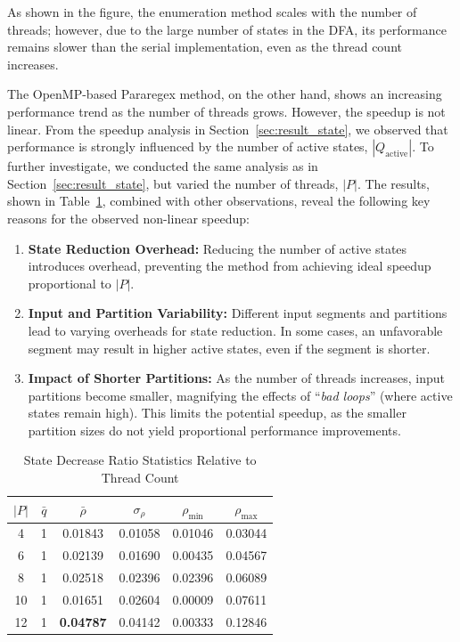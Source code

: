 \documentclass[sigconf]{acmart}
\newcommand{\minof}[1]{#1_{\text{min}}}
\newcommand{\maxof}[1]{#1_{\text{max}}}
\begin{document}
As shown in the figure, the enumeration method scales with the number of threads; however, due to the large number of states in the DFA, its performance remains slower than the serial implementation, even as the thread count increases.

The OpenMP-based Pararegex method, on the other hand, shows an increasing performance trend as the number of threads grows. However, the speedup is not linear. From the speedup analysis in Section~\ref{sec:result_state}, we observed that performance is strongly influenced by the number of active states, $|Q_{\text{active}}|$. To further investigate, we conducted the same analysis as in Section~\ref{sec:result_state}, but varied the number of threads, $|P|$. The results, shown in Table~\ref{tab:StateReductionThread}, combined with other observations, reveal the following key reasons for the observed non-linear speedup:

\begin{enumerate}
	\item \textbf{State Reduction Overhead:} Reducing the number of active states introduces overhead, preventing the method from achieving ideal speedup proportional to $|P|$.
	\item \textbf{Input and Partition Variability:} Different input segments and partitions lead to varying overheads for state reduction. In some cases, an unfavorable segment may result in higher active states, even if the segment is shorter.
	\item \textbf{Impact of Shorter Partitions:} As the number of threads increases, input partitions become smaller, magnifying the effects of ``\emph{bad loops}'' (where active states remain high). This limits the potential speedup, as the smaller partition sizes do not yield proportional performance improvements.
\end{enumerate}

\begin{table}[t]
	\caption{State Decrease Ratio Statistics Relative to Thread Count}
	\label{tab:StateReductionThread}
	\begin{tabular}{cccccc}
		\toprule
		$|P|$ & $\bar{q}$ & $\bar{\rho}$     & $\sigma_{\rho}$ & $\minof{\rho}$ & $\maxof{\rho}$ \\
		\midrule
		4     & 1         & 0.01843          & 0.01058         & 0.01046        & 0.03044        \\
		6     & 1         & 0.02139          & 0.01690         & 0.00435        & 0.04567        \\
		8     & 1         & 0.02518          & 0.02396         & 0.02396        & 0.06089        \\
		10    & 1         & 0.01651          & 0.02604         & 0.00009        & 0.07611        \\
		12    & 1         & \textbf{0.04787} & 0.04142         & 0.00333        & 0.12846        \\
		\bottomrule
	\end{tabular}
\end{table}
\end{document}
